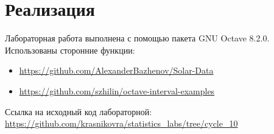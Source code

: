 \documentclass[12pt]{article}
\begin{document}
	\section{Реализация}
	
	Лабораторная работа выполнена с помощью пакета GNU Octave 8.2.0. Использованы сторонние функции: 
	\begin{itemize}
		\item \url{https://github.com/AlexanderBazhenov/Solar-Data}
		\item \url{https://github.com/szhilin/octave-interval-examples}
	\end{itemize}
	
	Ссылка на исходный код лабораторной: \url{https://github.com/krasnikovra/statistics_labs/tree/cycle_10}
	
\end{document}
